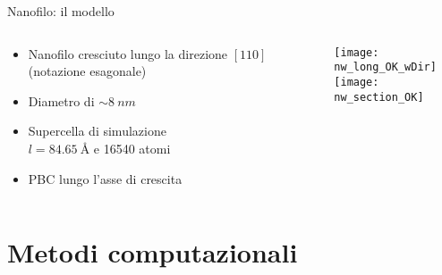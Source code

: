 \documentclass{beamer}
\begin{document}
\begin{frame}{Nanofilo: il modello}
 \begin{columns}
  \begin{column}{0.5\textwidth}
    \begin{itemize}
      \item Nanofilo cresciuto lungo la {\ev direzione $[110]$} (notazione esagonale)
      \item Diametro di $\sim \SI{8}{nm}$
      \item Supercella di simulazione \\ {\ev$l=\SI{84.65}{\angstrom}$} e {\ev\num{16540} atomi}
      \item PBC lungo l'asse di crescita
  \end{itemize}
  \end{column}
  \begin{column}{0.5\textwidth}
   \centering
   \texttt{[image: nw\_long\_OK\_wDir]}\\[6pt]
   \texttt{[image: nw\_section\_OK]}
  \end{column}
 \end{columns}
\end{frame}





\section{Metodi computazionali}



\end{document}
